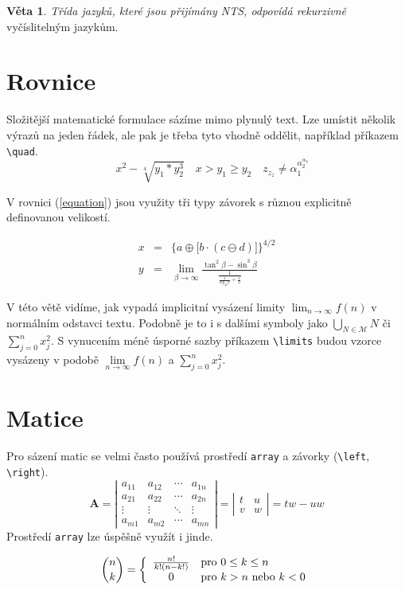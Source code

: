 \documentclass[a4paper, 11pt, twocolumn]{article}
\theoremstyle{definition}
\theoremstyle{definition}
\newtheorem{sentence}{Věta}
\begin{document}
\begin{sentence}
    \emph{Třída jazyků, které jsou přijímány NTS, odpovídá rekurzivně} vyčíslitelným jazykům.
\end{sentence}


\section{Rovnice}

Složitější matematické formulace sázíme mimo plynulý text. Lze umístit několik výrazů na jeden řádek, ale pak je třeba tyto vhodně oddělit, například příkazem \texttt{{\textbackslash quad}}.
$$\quad x^2-\sqrt[4]{y_1*y_2^3} \quad x > y_1 \geq y_2 \quad z_{z_z} \neq \alpha_1^{\alpha_2^{\alpha_3}}$$

V rovnici (\ref{equation}) jsou využity tři typy závorek s různou explicitně definovanou velikostí.

\begin{eqnarray}
\label{equation}x&=& \bigg\{a\oplus \Big[b \cdot (c\ominus d)\Big] \bigg\}^{4/2}\\
\label{Rovnice}y&=&\lim_{\beta \to \infty} \frac{\tan^2 \beta - \sin^3 \beta}{\frac{1}{\frac{1}{log_{42}x}+\frac{1}{2}}}
\end{eqnarray}
\par V této větě vidíme, jak vypadá implicitní vysázení limity $\lim_{n \to \infty} f(n)$ v normálním odstavci textu. Podobně je to i s dalšími symboly jako $\bigcup_{N\in \mathcal{M}} N$ či  $\sum_{j=0}^n x_j^2$. 
S vynucením méně úsporné sazby příkazem \texttt{{\textbackslash limits}} budou vzorce vysázeny v podobě $\lim\limits _{n \to \infty}f(n)$ a $\sum\limits _{j=0}^n x_j^2$. 


\section{Matice}

Pro sázení matic se velmi často používá prostředí \texttt{array} a závorky (\texttt{{\textbackslash left}}, \texttt{{\textbackslash right}}). 
$$ \mathrm{\textbf{A}} = \left|
\begin{array}{cccc}
a_{11}& a_{12}& \cdots& a_{1n}\\
a_{21}& a_{22}& \cdots& a_{2n}\\
\vdots& \vdots& \ddots& \vdots\\
a_{m1}& a_{m2}& \cdots& a_{mn}
\end{array} \right| = \left|
\begin{array}{cc}
t& u\\
v& w
\end{array}\right| =tw - uw$$
Prostředí \texttt{array} lze úspěšně využít i jinde.

$$ \binom{n}{k} = \left\{
\begin{array}{c l}
\frac{n!}{k!(n-k!)} & \text{pro 0} \leq k \leq n \\
0 & \text{pro } k > n \text{ nebo } k < 0
\end{array} \right.$$
\end{document}
